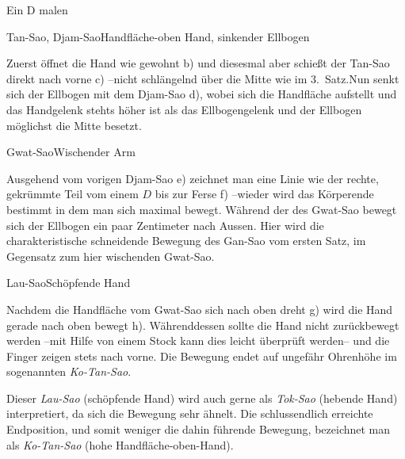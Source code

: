 \begin{WTSatz}{Ein D malen}%

	
	\begin{WTSatzTeil}{Tan-Sao, Djam-Sao}{Handfl\"ache-oben Hand, sinkender Ellbogen}
		
		Zuerst \"offnet die Hand wie gewohnt b) und diesesmal aber schie{\ss}t der Tan-Sao direkt nach vorne c) --nicht schl\"angelnd \"uber die Mitte wie im 3.~Satz.Nun senkt sich der Ellbogen mit dem Djam-Sao d), wobei sich die Handfl\"ache aufstellt und das Handgelenk stehts h\"oher ist als das Ellbogengelenk und der Ellbogen m\"oglichst die Mitte besetzt.
		
		
	\end{WTSatzTeil}
	\begin{WTSatzTeil}{Gwat-Sao}{Wischender Arm}
		
		Ausgehend vom vorigen Djam-Sao e) zeichnet man eine Linie wie der rechte, gekr\"ummte Teil vom einem $D$ bis zur Ferse f) --wieder wird das K\"orperende bestimmt in dem man sich maximal bewegt. W\"ahrend der  des Gwat-Sao bewegt sich der Ellbogen ein paar Zentimeter nach Aussen. Hier wird die charakteristische schneidende Bewegung des Gan-Sao vom ersten Satz, im Gegensatz zum hier wischenden Gwat-Sao.
		
	\end{WTSatzTeil}
	\begin{WTSatzTeil}{Lau-Sao}{Sch\"opfende Hand}
		
		Nachdem die Handfl\"ache vom Gwat-Sao sich nach oben dreht g) wird die Hand gerade nach oben bewegt h). W\"ahrenddessen sollte die Hand nicht zur\"uckbewegt werden --mit Hilfe von einem Stock kann dies leicht \"uberpr\"uft werden-- und die Finger zeigen stets nach vorne. Die Bewegung endet auf ungef\"ahr Ohrenh\"ohe im sogenannten \textit{Ko-Tan-Sao}.
		
		
	\begin{WTCommonBegriff}
		Dieser \textit{Lau-Sao} (sch\"opfende Hand) wird auch gerne als \textit{Tok-Sao} (hebende Hand) interpretiert, da sich die Bewegung sehr \"ahnelt. Die schlussendlich erreichte Endposition, und somit weniger die dahin f\"uhrende Bewegung, bezeichnet man als \textit{Ko-Tan-Sao} (hohe Handfl\"ache-oben-Hand).
	\end{WTCommonBegriff}
		

\end{WTSatzTeil}
\end{WTSatz}
